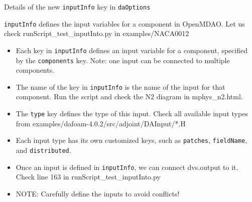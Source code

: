 \documentclass{bredelebeamer}
\begin{document}
\begin{frame}{Details of the new \texttt{inputInfo} key in \texttt{daOptions}}

  \texttt{inputInfo} defines the input variables for a component in OpenMDAO. Let us check runScript\_test\_inputInto.py in examples/NACA0012
  
  \begin{itemize}
  
    \item Each key in \texttt{inputInfo} defines an input variable for a component, specified by the \texttt{components} key. Note: one input can be connected to multiple components.
    \item The name of the key in \texttt{inputInfo} is the name of the input for that component. Run the script and check the N2 diagram in mphys\_n2.html.
    \item The \texttt{type} key defines the type of this input. Check all available input types from examples/dafoam-4.0.2/src/adjoint/DAInput/*.H
    \item Each input type has its own customized keys, such as \texttt{patches}, \texttt{fieldName}, and \texttt{distributed}.
    \item Once an input is defined in \texttt{inputInfo}, we can connect dvs.output to it. Check line 163 in runScript\_test\_inputInto.py
    \item NOTE: Carefully define the inputs to avoid conflicts!
  \end{itemize}
  
  \end{frame}
\end{document}
